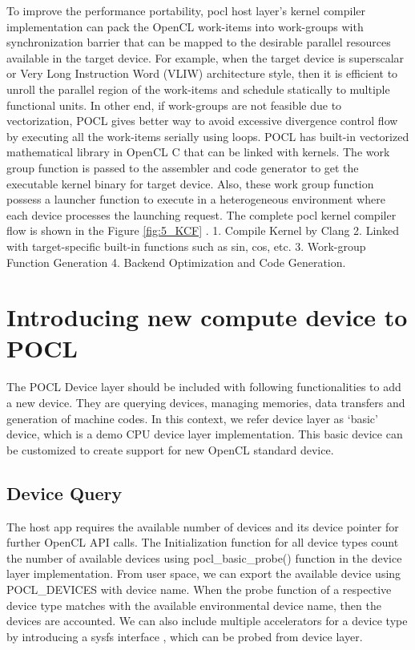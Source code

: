 To improve the performance portability, pocl host layer’s kernel compiler implementation can pack the OpenCL work-items into work-groups with synchronization barrier that can be mapped to the desirable parallel resources available in the target device. For example, when the target device is superscalar or Very Long Instruction Word (VLIW) architecture style, then it is efficient to unroll the parallel region of the work-items and schedule statically to multiple functional units. In other end, if work-groups are not feasible due to vectorization, POCL gives better way to avoid excessive divergence control flow by executing all the work-items serially using loops. POCL has built-in vectorized mathematical library in OpenCL C that can be linked with kernels. The work group function is passed to the assembler and code generator to get the executable kernel binary for target device. Also, these work group function possess a launcher function to execute in a heterogeneous environment where each device processes the launching request. The complete pocl kernel compiler flow is shown in the Figure \ref{fig:5_KCF} \cite{18}. 1. Compile Kernel by Clang 2. Linked with target-specific built-in functions such as sin, cos, etc. 3. Work-group Function Generation 4. Backend Optimization and Code Generation.


\section{Introducing new compute device to POCL}
The POCL Device layer should be included with following functionalities to add a new device. They are querying devices, managing memories, data transfers and generation of machine codes. In this context, we refer device layer as ‘basic’ device, which is a demo CPU device layer implementation. This basic device can be customized to create support for new OpenCL standard device.

\subsection{Device Query}
The host app requires the available number of devices and its device pointer for further OpenCL API calls. The Initialization function for all device types count the number of available devices using pocl\_basic\_probe() function in the device layer implementation. From user space, we can export the available device using POCL\_DEVICES with device name. When the probe function of a respective device type matches with the available environmental device name, then the devices are accounted. We can also include multiple accelerators for a device type by introducing a sysfs interface \cite{14}, which can be probed from device layer.

